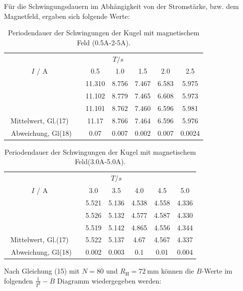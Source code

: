 Für die Schwingungsdauern im Abhängigkeit von der Stromstärke, bzw. dem Magnetfeld, ergaben sich folgende Werte:
\begin{table} [H]
	\centering
	\caption{Periodendauer der Schwingungen der Kugel mit magnetischem Feld (0.5A-2-5A).}
	\label{tab:T3.1}
	\begin{tabular}{S[table-format=1.5] S S S S S S}
		\toprule
		& &  \\
		\cmidrule(lr){4-4}
		{$I$ / A} && {0.5\;} & {1.0\;} & {1.5 \;} & {2.0 \;} & {2.5} \\
		\midrule
		&&11.310&8.756&7.467&6.583&5.975\\
		&&11.102&8.779&7.465&6.608&5.973\\
		&&11.101&8.762&7.460&6.596&5.981\\
		\bottomrule
		{Mittelwert, Gl.(17)}&& 11.17 & 8.766& 7.464& 6.596& 5.976\\
		{\, Abweichung, Gl(18)}&& 0.07 & 0.007& 0.002& 0.007& 0.0024\\
	\end{tabular}
\end{table}

\begin{table} [H]
	\centering
	\caption{Periodendauer der Schwingungen der Kugel mit magnetischem Feld(3.0A-5.0A).}
	\label{tab:T3.2}
	\begin{tabular}{S[table-format=1.5] S S S S S S}
		\toprule
		& &  \\
		\cmidrule(lr){4-4}
		{$I$ / A} && {3.0 \;} & {3.5 \;} & {4.0 \;} & {4.5 \;} & {5.0} \\
		\midrule
		&&5.521&5.136&4.538&4.558&4.336\\
		&&5.526&5.132&4.577&4.587&4.330\\
		&&5.519&5.142&4.865&4.556&4.344\\
		\bottomrule
		{Mittelwert, Gl.(17)}&& 5.522& 5.137& 4.67& 4.567&4.337 \\
		{\, Abweichung, Gl(18)}&& 0.002& 0.003& 0.1& 0.01&0.004\\
	\end{tabular}
\end{table}
\newpage

Nach Gleichung (15) mit $N = 80$ und $R_\text{H} = \SI{72}{\milli\metre}$ können die $B$-Werte im folgenden $\frac{1}{T^2} - B$ Diagramm wiedergegeben werden:

